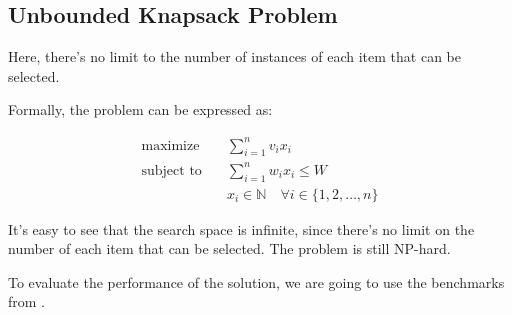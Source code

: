   \subsection{Unbounded Knapsack Problem}
    Here, there's no limit to the number of instances of each item that can be 
    selected.

    Formally, the problem can be expressed as:

    \begin{equation}
      \label{eq:knapsack:unbounded}
      \begin{aligned}
        \text{maximize} \quad & \sum_{i=1}^{n} v_i x_i \\
        \text{subject to} \quad & \sum_{i=1}^{n} w_i x_i \leq W \\
          & x_i \in \mathbb{N} \quad \forall i \in \{1, 2, \dots, n\}
      \end{aligned}
    \end{equation}

    It's easy to see that the search space is infinite, since there's no limit
    on the number of each item that can be selected.
    The problem is still NP-hard.

    To evaluate the performance of the solution, we are going to use the
    benchmarks from \autocite{andonovUnboundedKnapsackProblem2000}.

